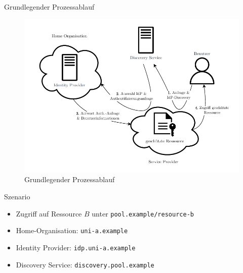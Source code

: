 \begin{frame}{Grundlegender Prozessablauf}
    \begin{figure}
        \includegraphics[height=0.7\paperheight]{../assets/basic_interaction_article.drawio.pdf}
        \caption{Grundlegender Prozessablauf~\cite{shibbolethShibbolethConcepts2023, switchExpertDemoSWITCHaai2024a, michelsIdentityManagementUnd}}
    \end{figure}
\end{frame}


\begin{frame}{Szenario}
    \begin{itemize}
        \item Zugriff auf Ressource $B$ unter \texttt{pool.example/resource-b}
        \item Home-Organisation: \texttt{uni-a.example}
        \item Identity Provider: \texttt{idp.uni-a.example}
        \item Discovery Service: \texttt{discovery.pool.example}
    \end{itemize}
\end{frame}
